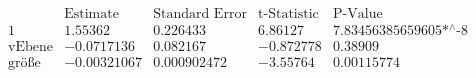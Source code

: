 \[\begin{array}{l|llll}
 \text{} & \text{Estimate} & \text{Standard Error} & \text{t-Statistic} & \text{P-Value} \\
\hline
 1 & 1.55362 & 0.226433 & 6.86127 & \text{7.83456385659605$\grave{ }$*${}^{\wedge}$-8} \\
 \text{vEbene} & -0.0717136 & 0.082167 & -0.872778 & 0.38909 \\
 \text{gr{\" o}{\ss}e} & -0.00321067 & 0.000902472 & -3.55764 & 0.00115774 \\
\end{array}\]

